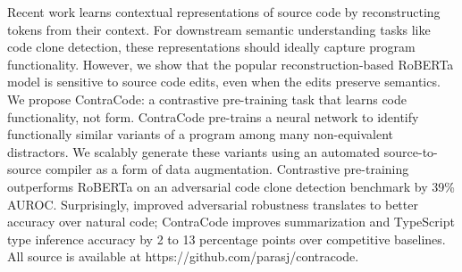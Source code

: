 Recent work learns contextual representations of source code by reconstructing tokens from their context. For downstream semantic understanding tasks like code clone detection, these representations should ideally capture program functionality. However, we show that the popular reconstruction-based RoBERTa model is sensitive to source code edits, even when the edits preserve semantics. We propose ContraCode: a contrastive pre-training task that learns code functionality, not form. ContraCode pre-trains a neural network to identify functionally similar variants of a program among many non-equivalent distractors. We scalably generate these variants using an automated source-to-source compiler as a form of data augmentation. Contrastive pre-training outperforms RoBERTa on an adversarial code clone detection benchmark by 39\% AUROC. Surprisingly, improved adversarial robustness translates to better accuracy over natural code; ContraCode improves summarization and TypeScript type inference accuracy by 2 to 13 percentage points over competitive baselines. All source is available at https://github.com/parasj/contracode.

